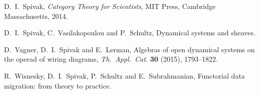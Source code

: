 \documentclass[12pt]{amsart}
\begin{document}
\begin{thebibliography}{10}
  D.\ I.\ Spivak, \textsl{Category Theory for Scientists}, MIT Press, Cambridge Massachusetts, 2014.

 D.\ I.\ Spivak, C.\ Vasilakopoulou and P.\ Schultz, Dynamical systems and sheaves.  %

 D.\ Vagner, D.\ I.\ Spivak and E.\ Lerman, Algebras of open dynamical systems on the operad of wiring diagrams, \textsl{Th.\ Appl.\ Cat.} \textbf{30} (2015), 1793--1822.   %

  R.\ Wisnesky, D.\ I.\ Spivak, P.\ Schultz and E.\ Subrahmanian, Functorial data migration: from theory to practice.  %

\end{thebibliography}
\end{document}

